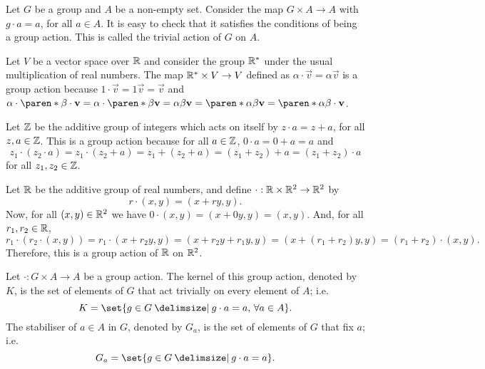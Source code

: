 \documentclass[11pt]{penrose}
\begin{document}
\begin{negg}
    Let $G$ be a group and $A$ be a non-empty set. Consider the map $G \times A \to A$ with $g \cdot a = a$, for all $a \in A$. It is easy to check that it satisfies the conditions of being a group action. This is called the trivial action of $G$ on $A$.
\end{negg}

\begin{negg}
    Let $V$ be a vector space over $\mathbb{R}$ and consider the group $\mathbb{R}^{*}$ under the usual multiplication of real numbers. The map $\mathbb{R}^{*} \times V \to V$ defined as $\alpha \cdot \vec{v} = \alpha \vec{v}$ is a group action because $1 \cdot \vec{v} = 1\vec{v} = \vec{v}$ and $\alpha \cdot \paren*{ \beta \cdot \vec{v} } = \alpha \cdot \paren*{ \beta\vec{v} } = \alpha\beta\vec{v} = \paren*{\alpha\beta} \vec{v} = \paren*{\alpha\beta} \cdot \vec{v}$.
\end{negg}

\begin{negg}
    Let $\mathbb{Z}$ be the additive group of integers which acts on itself by $z \cdot a = z + a$, for all $z, a \in \mathbb{Z}$. This is a group action because for all $a \in \mathbb{Z}$, $0 \cdot a = 0 + a = a$ and
    \begin{equation*}
        z_{1} \cdot (z_{2} \cdot a)
        = z_{1} \cdot (z_{2} + a)
        = z_{1} + (z_{2} + a)
        = (z_{1} + z_{2}) + a
        = (z_{1} + z_{2}) \cdot a
    \end{equation*}
    for all $z_{1}, z_{2} \in \mathbb{Z}$.
\end{negg}

\begin{negg}
    Let $\mathbb{R}$ be the additive group of real numbers, and define $\cdot : \mathbb{R} \times \mathbb{R}^{2} \to \mathbb{R}^{2}$ by
    \begin{equation*}
        r \cdot (x,y) = (x + ry, y).
    \end{equation*}
    Now, for all $(x,y) \in \mathbb{R}^{2}$ we have $0 \cdot (x,y) = (x + 0y, y) = (x, y)$. And, for all $r_{1}, r_{2} \in \mathbb{R}$,
    \begin{equation*}
        r_{1} \cdot (r_{2} \cdot (x,y))
        = r_{1} \cdot (x + r_{2}y, y)
        = (x + r_{2}y + r_{1}y, y)
        = (x + (r_{1} + r_{2})y, y)
        = (r_{1} + r_{2}) \cdot (x, y).
    \end{equation*}
    Therefore, this is a group action of $\mathbb{R}$ on $\mathbb{R}^{2}$.
\end{negg}

\begin{ndfn}
    Let $\cdot : G \times A \to A$ be a group action. The kernel of this group action, denoted by $K$, is the set of elements of $G$ that act trivially on every element of $A$; i.e.
    \begin{equation*}
        K = \set{g \in G \st g \cdot a = a, \, \forall a \in A}.
    \end{equation*}
    The stabiliser of $a \in A$ in $G$, denoted by $G_{a}$, is the set of elements of $G$ that fix $a$; i.e.
    \begin{equation*}
        G_{a} = \set{g \in G \st g \cdot a = a}.
    \end{equation*}
\end{ndfn}
\end{document}
